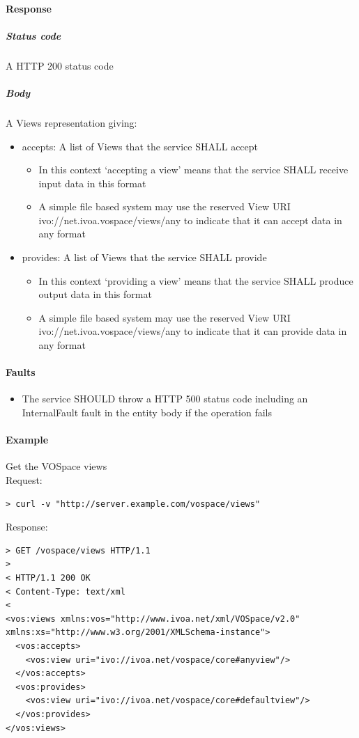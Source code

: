 \documentclass[11pt,a4paper]{ivoa}
\begin{document}
\paragraph{Response}
\subparagraph{Status code} A HTTP 200 status code
\subparagraph{Body}
A Views representation giving:
\begin{itemize}
    \item accepts: A list of Views that the service SHALL accept
    \begin{itemize}
        \item In this context `accepting a view' means that the service SHALL receive input data in this format
        \item A simple file based system may use the reserved View URI ivo://net.ivoa.vospace/views/any to indicate that it can accept data in any format
    \end{itemize}
    \item provides: A list of Views that the service SHALL provide
    \begin{itemize}
        \item In this context `providing a view' means that the service SHALL produce output data in this format
        \item A simple file based system may use the reserved View URI ivo://net.ivoa.vospace/views/any to indicate that it can provide data in any format
    \end{itemize}
\end{itemize}

\paragraph{Faults}
\begin{itemize}
    \item The service SHOULD throw a HTTP 500 status code including an InternalFault fault in the entity body if the operation fails
\end{itemize}

\paragraph{Example}
Get the VOSpace views
\\[5px]
\noindent
Request:
\begin{lstlisting}
> curl -v "http://server.example.com/vospace/views"
\end{lstlisting}
Response:
\begin{lstlisting}
> GET /vospace/views HTTP/1.1
>
< HTTP/1.1 200 OK
< Content-Type: text/xml
<
<vos:views xmlns:vos="http://www.ivoa.net/xml/VOSpace/v2.0" xmlns:xs="http://www.w3.org/2001/XMLSchema-instance">
  <vos:accepts>
    <vos:view uri="ivo://ivoa.net/vospace/core#anyview"/>
  </vos:accepts>
  <vos:provides>
    <vos:view uri="ivo://ivoa.net/vospace/core#defaultview"/>
  </vos:provides>
</vos:views>
\end{lstlisting}
\end{document}
